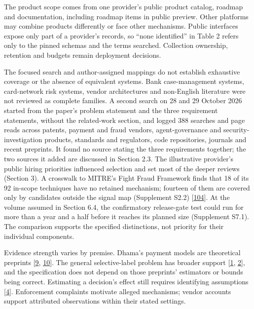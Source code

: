\documentclass[
  11pt,
]{article}
\begin{document}
The product scope comes from one provider's public product catalog,
roadmap and documentation, including roadmap items in public preview.
Other platforms may combine products differently or face other
mechanisms. Public interfaces expose only part of a provider's records,
so ``none identified'' in Table 2 refers only to the pinned schemas and
the terms searched. Collection ownership, retention and budgets remain
deployment decisions.

The focused search and author-assigned mappings do not establish
exhaustive coverage or the absence of equivalent systems. Bank
case-management systems, card-network risk systems, vendor architectures
and non-English literature were not reviewed as complete families. A
second search on 28 and 29 October 2026 started from the paper's problem
statement and the three requirement statements, without the related-work
section, and logged 388 searches and page reads across patents, payment
and fraud vendors, agent-governance and security-investigation products,
standards and regulators, code repositories, journals and recent
preprints. It found no source stating the three requirements together;
the two sources it added are discussed in Section 2.3. The illustrative
provider's public hiring priorities influenced selection and set most of
the deeper reviews (Section 3). A crosswalk to MITRE's Fight Fraud
Framework finds that 18 of its 92 in-scope techniques have no retained
mechanism; fourteen of them are covered only by candidates outside the
signal map (Supplement S2.2)
{[}\protect\hyperlink{ref-MITRE2026F3}{104}{]}. At the volume assumed in
Section 6.4, the confirmatory release-gate test could run for more than
a year and a half before it reaches its planned size (Supplement S7.1).
The comparison supports the specified distinctions, not priority for
their individual components.

Evidence strength varies by premise. Dhama's payment models are
theoretical preprints {[}\protect\hyperlink{ref-Dhama2026Causal}{9},
\protect\hyperlink{ref-Dhama2026Limits}{10}{]}. The general
selective-label problem has broader support
{[}\protect\hyperlink{ref-Lakkaraju2017Selective}{1},
\protect\hyperlink{ref-Kilbertus2020Fair}{2}{]}, and the specification
does not depend on those preprints' estimators or bounds being correct.
Estimating a decision's effect still requires identifying assumptions
{[}\protect\hyperlink{ref-HernanRobins2020}{4}{]}. Enforcement
complaints motivate alleged mechanisms; vendor accounts support
attributed observations within their stated settings.
\end{document}
